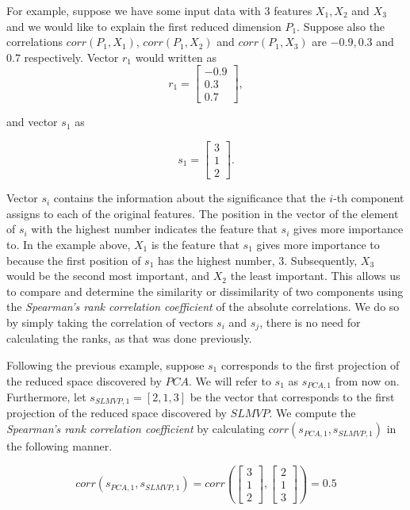 For example, suppose we have some input data with 3 features $X_1, X_2$ and $X_3$ and we would like to explain the first reduced dimension $P_1$. Suppose also the correlations $corr(P_1, X_1)$, $corr(P_1, X_2)$ and $corr(P_1, X_3)$ are $-0.9, 0.3$ and $0.7$ respectively. Vector $r_1$ would written as
$$
    r_1 =
    \begin{bmatrix}
        -0.9 \\
        0.3  \\
        0.7
    \end{bmatrix},
$$

and vector $s_1$ as

$$
    s_1 =
    \begin{bmatrix}
        3 \\
        1 \\
        2
    \end{bmatrix}.
$$

Vector $s_i$ contains the information about the significance that the $i$-th component assigns to each of the original features. The position in the vector of the element of $s_i$ with the highest number indicates the feature that $s_i$ gives more importance to. In the example above, $X_1$ is the feature that $s_1$ gives more importance to because the first position of $s_1$ has the highest number, $3$. Subsequently, $X_3$ would be the second most important, and $X_2$ the least important. This allows us to compare and determine the similarity or dissimilarity of two components using the \textit{Spearman's rank correlation coefficient} of the absolute correlations. We do so by simply taking the correlation of vectors $s_i$ and $s_j$, there is no need for calculating the ranks, as that was done previously.

Following the previous example, suppose $s_1$ corresponds to the first projection of the reduced space discovered by $PCA$. We will refer to $s_1$ as $s_{PCA,1}$ from now on. Furthermore, let $s_{SLMVP,1} = [ 2, 1, 3 ]$ be the vector that corresponds to the first projection of the reduced space discovered by $SLMVP$. We compute the \textit{Spearman's rank correlation coefficient} by calculating $corr(s_{PCA,1}, s_{SLMVP,1})$ in the following manner.

$$
    corr(s_{PCA,1}, s_{SLMVP,1}) =
    corr \left(
    \begin{bmatrix}
            3 \\
            1 \\
            2
        \end{bmatrix},
    \begin{bmatrix}
            2 \\
            1 \\
            3
        \end{bmatrix}
    \right) = 0.5
$$

